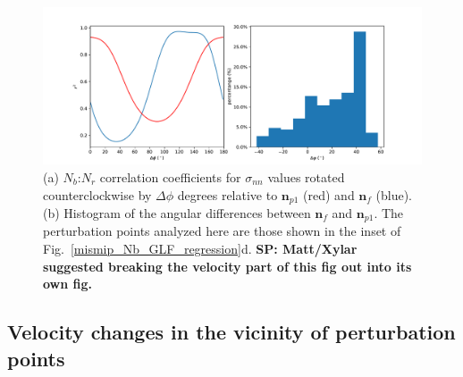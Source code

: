 \documentclass[tc, manuscript]{copernicus}
\begin{document}
\begin{figure}
\centering
\includegraphics[width=1\linewidth]{figs/mismip_r2_all_direction.pdf}
    \caption{(a) $N_b$:$N_r$ correlation coefficients for $\sigma_{nn}$ values rotated counterclockwise by $\Delta\phi$ degrees relative to $\mathbf{n}_{p1}$ (red) and $\mathbf{n}_{f}$ (blue). (b) Histogram of the angular differences between $\mathbf{n}_{f}$ and $\mathbf{n}_{p1}$. The perturbation points analyzed here are those shown in the inset of Fig.~\ref{mismip_Nb_GLF_regression}d. \textbf{SP: Matt/Xylar suggested breaking the velocity part of this fig out into its own fig.}}
    \label{mismip_r2_all_direction}
\end{figure}

\subsection{Velocity changes in the vicinity of perturbation points}
\end{document}
